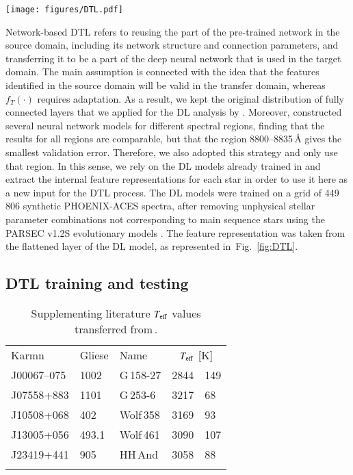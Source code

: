 \documentclass{aa}
\begin{document}
\begin{figure*}
  \centering
  \texttt{[image: figures/DTL.pdf]}  
  \caption{Representation of the adopted strategy for the network-based approach, where the ANN component has been redesigned with respect to the DL model derived from PHOENIX-ACES spectra \citep[to be compared with Fig.~1 of][]{ Passegger2020}.}
  \label{fig:DTL}
\end{figure*}

Network-based DTL refers to reusing the part of the pre-trained network in the source domain, including its network structure and connection parameters, and transferring it to be a part of the deep neural network that is used in the target domain. 
The main assumption is connected with the idea that the features identified in the source domain will be valid in the transfer domain, whereas $f_T(\cdot)$ requires adaptation. 
As a result, we kept the original distribution of fully connected layers that we applied for the DL analysis by \cite{Passegger2020}. Moreover, \cite{Passegger2020} constructed several neural network models for different spectral regions, finding that the results for all regions are comparable, but that the region 8800--8835\,\AA{} gives the smallest validation error. Therefore, we also adopted this strategy and only use that region.
In this sense, we rely on the DL models already trained in \cite{Passegger2020} and extract the internal feature representations for each star in order to use it here as a new input for the DTL process. The DL models were trained on a grid of 449 806 synthetic PHOENIX-ACES spectra, after removing unphysical stellar parameter combinations not corresponding to main sequence stars using the PARSEC v1.2S evolutionary models \citep{Bressan2012,Chen2014,Chen2015,Tang2014}. 
The feature representation was taken from the flattened layer of the DL model, as represented in~Fig.~\ref{fig:DTL}.

\subsection{DTL training and testing}
\label{sect:dtl_training_testing}

\begin{table}[]
\caption{Supplementing literature $T_{\rm eff}$ values transferred from\,\citet{Passegger2022}.}
\label{tab:lit_teff}
\centering %
\begin{tabular}{lllc@{\,$\pm$\,}l}
    \hline
    \hline
    \noalign{\smallskip}
    Karmn    & Gliese   & Name   & \multicolumn{2}{c}{$T_{\rm eff}$ [K]} \\
    \noalign{\smallskip}
    \hline
    \noalign{\smallskip}
 J00067--075 & 1002 & G\,158-27 &  2844 & 149 \\
 J07558+883 & 1101  & G\,253-6  &  3217 & 68  \\
 J10508+068 & 402   & Wolf\,358 &  3169 & 93  \\
 J13005+056 & 493.1 & Wolf\,461 &  3090 & 107 \\
 J23419+441 & 905   & HH\,And   &  3058 & 88  \\
    \noalign{\smallskip}
    \hline
\end{tabular}%
\end{table}
\end{document}
